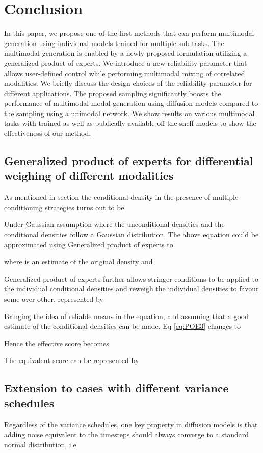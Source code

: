 \documentclass[10pt,twocolumn,letterpaper]{article}
\begin{document}
\section{Conclusion}

In this paper, we propose one of the first methods that can perform multimodal generation using individual models trained for multiple sub-tasks. The multimodal generation is enabled by a newly proposed formulation utilizing a generalized product of experts. We introduce a new reliability parameter that allows user-defined control while performing multimodal mixing of correlated modalities. We briefly discuss the design choices of the reliability parameter for different applications. The proposed sampling significantly boosts the performance of multimodal modal generation using diffusion models  compared to the sampling using a unimodal network. We show results on various multimodal tasks with trained as well as publically available off-the-shelf models to show the effectiveness of our method.
{\small


}
\newpage

\subsection{Generalized product of experts for differential weighing of different modalities}


As mentioned in section the conditional density in the presence of multiple conditioning strategies turns out to be


Under Gaussian assumption where the unconditional densities and the conditional densities follow a Gaussian distribution, The above equation could be approximated using Generalized product of experts\cite{cao2014generalized} to


where  is an estimate of the original density and 

Generalized product of experts\cite{cao2014generalized} further allows stringer conditions to be applied to the individual conditional densities and reweigh the individual densities to favour some over other, represented by


Bringing the idea of reliable means in the equation, and assuming that a good estimate of the conditional densities can be made, Eq \ref{eq:POE3} changes to

Hence the effective score becomes 
 

The equivalent score can be represented by 

\subsection{Extension to cases with different variance schedules}
Regardless of the variance schedules, one key property in diffusion models is that adding noise equivalent to the  timesteps should always converge to a standard normal distribution, i.e
\end{document}
